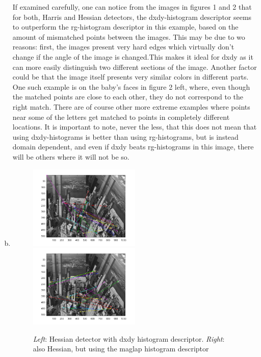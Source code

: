 \documentclass[12pt]{article}
\begin{document}
\begin{enumerate}[a)]
	If examined carefully, one can notice from the images in figures 1 and 2 that for both, Harris and Hessian detectors, the dxdy-histogram descriptor seems to outperform the rg-histogram descriptor in this example, based on the amount of mismatched points between the images. This may be due to wo reasons: first, the images present very hard edges which virtually don't change if the angle of the image is changed.This makes it ideal for dxdy as it can more easily distinguish two different sections of the image. Another factor could be that the image itself presents very similar colors in different parts. One such example is on the baby's faces in figure 2 left, where, even though the matched points are close to each other, they do not correspond to the right match. There are of course other more extreme examples where points near some of the letters get matched to points in completely different locations.
	It is important to note, never the less, that this does not mean that using dxdy-histograms is better than using rg-histograms, but is instead domain dependent, and even if dxdy beats rg-histograms in this image, there will be others where it will not be so.
	\item
	
	\begin{figure}[h]
		\includegraphics[width=0.5\textwidth]{ny_hes_dxdy}
		\includegraphics[width=0.5\textwidth]{ny_hes_maglap}
		\caption{\textit{Left}: Hessian detector with dxdy histogram descriptor. \textit{Right}: also Hessian, but using the maglap histogram descriptor }
	\end{figure}
	

\end{enumerate}
\end{document}
